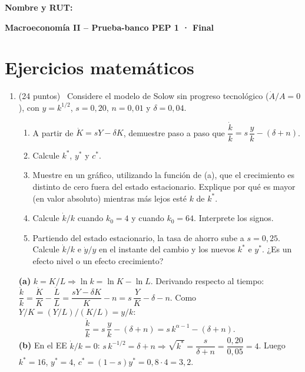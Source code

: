 \documentclass[12pt,letterpaper]{article}
\newif\ifpauta
\newcommand{\oblig}[1]{\fbox{\footnotesize\textbf{OBLIGATORIO} · $p\approx #1$}\,}
\begin{document}
\textbf{Nombre y RUT:}\\[0.3em]
\framebox[\linewidth]{\rule{0pt}{1.4cm}}

\begin{center}
{\Large\textbf{Macroeconomía II -- Prueba-banco PEP 1 · Final}}\ifpauta\\[0.2em]{\large\textbf{Pauta}}\fi
\end{center}


\section*{Ejercicios matemáticos}
\begin{enumerate}[label=\arabic*.,leftmargin=1.6em,itemsep=0.8em]

\item (24 puntos) \oblig{0{,}95} Considere el modelo de Solow sin progreso tecnológico ($\dot A/A=0$), con $y=k^{1/2}$, $s=0{,}20$, $n=0{,}01$ y $\delta=0{,}04$.
\begin{enumerate}[label=(\alph*)]
\item A partir de $\dot K=sY-\delta K$, demuestre paso a paso que $\dfrac{\dot k}{k}=s\,\dfrac{y}{k}-(\delta+n)$.
\item Calcule $k^*$, $y^*$ y $c^*$.
\item Muestre en un gráfico, utilizando la función de (a), que el crecimiento es distinto de cero fuera del estado estacionario. Explique por qué es mayor (en valor absoluto) mientras más lejos esté $k$ de $k^*$.
\item Calcule $\dot k/k$ cuando $k_0=4$ y cuando $k_0=64$. Interprete los signos.
\item Partiendo del estado estacionario, la tasa de ahorro sube a $s=0{,}25$. Calcule $\dot k/k$ e $\dot y/y$ en el instante del cambio y los nuevos $k^*$ e $y^*$. ¿Es un efecto nivel o un efecto crecimiento?
\end{enumerate}
\begin{resp}
\textbf{(a)} $k=K/L\Rightarrow \ln k=\ln K-\ln L$. Derivando respecto al tiempo: $\dfrac{\dot k}{k}=\dfrac{\dot K}{K}-\dfrac{\dot L}{L}=\dfrac{sY-\delta K}{K}-n=s\,\dfrac{Y}{K}-\delta-n$. Como $Y/K=(Y/L)/(K/L)=y/k$:
\[\frac{\dot k}{k}=s\,\frac{y}{k}-(\delta+n)=s\,k^{\alpha-1}-(\delta+n).\]
\textbf{(b)} En el EE $\dot k/k=0$: $s\,k^{-1/2}=\delta+n\Rightarrow \sqrt{k^*}=\dfrac{s}{\delta+n}=\dfrac{0{,}20}{0{,}05}=4$. Luego $k^*=16$, $y^*=4$, $c^*=(1-s)y^*=0{,}8\cdot4=3{,}2$.


\end{resp}
\end{enumerate}
\end{document}
